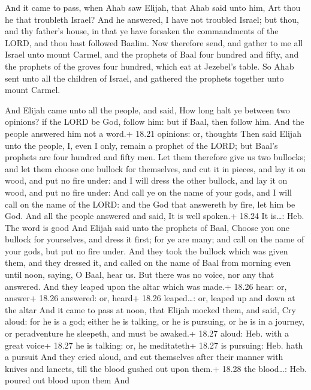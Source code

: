  And it came to pass, when Ahab saw Elijah, that Ahab
said unto him, Art thou he that troubleth Israel?  And he
answered, I have not troubled Israel; but thou, and thy father's house,
in that ye have forsaken the commandments of the LORD, and thou hast
followed Baalim.  Now therefore send, and gather to me all
Israel unto mount Carmel, and the prophets of Baal four hundred and
fifty, and the prophets of the groves four hundred, which eat at
Jezebel's table.  So Ahab sent unto all the children of
Israel, and gathered the prophets together unto mount Carmel.

 And Elijah came unto all the people, and said, How long
halt ye between two opinions? if the LORD be God, follow him: but if
Baal, then follow him. And the people answered him not a word.+ 18.21
opinions: or, thoughts  Then said Elijah unto the people,
I, even I only, remain a prophet of the LORD; but Baal's prophets are
four hundred and fifty men.  Let them therefore give us two
bullocks; and let them choose one bullock for themselves, and cut it in
pieces, and lay it on wood, and put no fire under: and I will dress the
other bullock, and lay it on wood, and put no fire under: 
And call ye on the name of your gods, and I will call on the name of the
LORD: and the God that answereth by fire, let him be God. And all the
people answered and said, It is well spoken.+ 18.24 It is\ldots: Heb.
The word is good  And Elijah said unto the prophets of
Baal, Choose you one bullock for yourselves, and dress it first; for ye
are many; and call on the name of your gods, but put no fire under.
 And they took the bullock which was given them, and they
dressed it, and called on the name of Baal from morning even until noon,
saying, O Baal, hear us. But there was no voice, nor any that answered.
And they leaped upon the altar which was made.+ 18.26 hear: or, answer+
18.26 answered: or, heard+ 18.26 leaped\ldots: or, leaped up and down at
the altar  And it came to pass at noon, that Elijah mocked
them, and said, Cry aloud: for he is a god; either he is talking, or he
is pursuing, or he is in a journey, or peradventure he sleepeth, and
must be awaked.+ 18.27 aloud: Heb. with a great voice+ 18.27 he is
talking: or, he meditateth+ 18.27 is pursuing: Heb. hath a pursuit
 And they cried aloud, and cut themselves after their
manner with knives and lancets, till the blood gushed out upon them.+
18.28 the blood\ldots: Heb. poured out blood upon them  And
